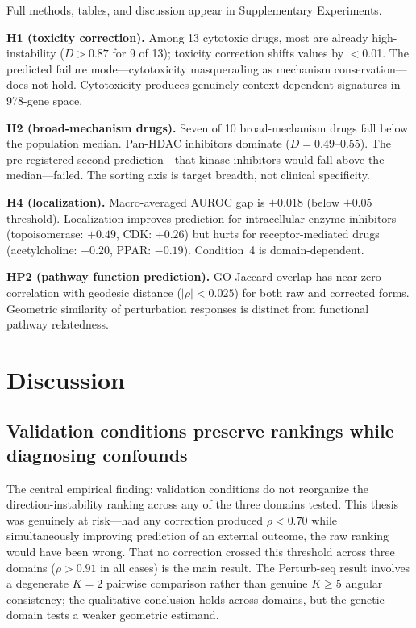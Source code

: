 \documentclass[11pt]{article}
\begin{document}
Full methods, tables, and discussion appear in Supplementary Experiments.

\textbf{H1 (toxicity correction).} Among 13 cytotoxic drugs, most are already high-instability ($D > 0.87$
for 9 of 13); toxicity correction shifts values by $<$0.01. The predicted
failure mode---cytotoxicity masquerading as mechanism conservation---does
not hold. Cytotoxicity produces genuinely context-dependent signatures in
978-gene space.

\textbf{H2 (broad-mechanism drugs).} Seven of 10 broad-mechanism drugs fall below the population median.
Pan-HDAC inhibitors dominate ($D = 0.49$--$0.55$). The pre-registered
second prediction---that kinase inhibitors would fall above the
median---failed. The sorting axis is target breadth, not clinical
specificity.

\textbf{H4 (localization).} Macro-averaged AUROC gap is $+0.018$ (below $+0.05$ threshold). Localization
improves prediction for intracellular enzyme inhibitors (topoisomerase:
$+0.49$, CDK: $+0.26$) but hurts for receptor-mediated drugs
(acetylcholine: $-0.20$, PPAR: $-0.19$). Condition~4 is domain-dependent.

\textbf{HP2 (pathway function prediction).} GO Jaccard overlap has near-zero correlation with geodesic distance
($|\rho| < 0.025$) for both raw and corrected forms. Geometric similarity
of perturbation responses is distinct from functional pathway relatedness.

\section{Discussion}

\subsection{Validation conditions preserve rankings while diagnosing confounds}

The central empirical finding: validation conditions do not reorganize the
direction-instability ranking across any of the three domains tested. This
thesis was genuinely at risk---had any correction produced $\rho < 0.70$
while simultaneously improving prediction of an external outcome, the raw
ranking would have been wrong. That no correction crossed this threshold
across three domains ($\rho > 0.91$ in all cases) is the main result.
The Perturb-seq result involves a degenerate $K = 2$ pairwise comparison
rather than genuine $K \geq 5$ angular consistency; the qualitative
conclusion holds across domains, but the genetic domain tests a weaker
geometric estimand.
\end{document}
